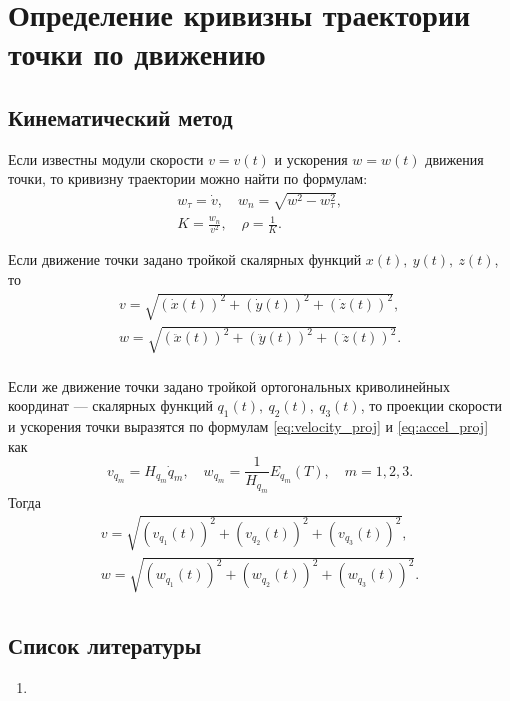 \section{Определение кривизны траектории точки по движению}

\subsection{Кинематический метод}

Если известны модули скорости $v = v(t)$ и ускорения $w = w(t)$ движения точки,
то кривизну траектории можно найти по формулам:
\begin{equation}
  \begin{gathered}
    w_\tau = \dot{v}, \quad w_n = \sqrt{w^2 - w_\tau^2}, \\
    K = \frac{w_n}{v^2}, \quad \rho = \frac{1}{K}.
  \end{gathered}
\end{equation}

Если движение точки задано тройкой скалярных функций $x(t),~y(t),~z(t)$, то
\begin{equation}
  \begin{gathered}
    v = \sqrt{(\dot{x}(t))^2 + (\dot{y}(t))^2 + (\dot{z}(t))^2}, \\
    w = \sqrt{(\ddot{x}(t))^2 + (\ddot{y}(t))^2 + (\ddot{z}(t))^2}. \\
  \end{gathered}
\end{equation}

Если же движение точки задано тройкой ортогональных криволинейных координат
--- скалярных функций $q_1(t),~q_2(t),~q_3(t)$, то проекции скорости и
ускорения точки выразятся по формулам \ref{eq:velocity_proj} и
\ref{eq:accel_proj} как
\begin{equation*}
  v_{q_m} = H_{q_m} \dot{q}_m, \quad w_{q_m} = \frac{1}{H_{q_m}} E_{q_m} (T),
    \quad m = 1,2,3.
\end{equation*}
Тогда
\begin{equation}
  \begin{gathered}
    v = \sqrt{(v_{q_1}(t))^2 + (v_{q_2}(t))^2 + (v_{q_3}(t))^2}, \\
    w = \sqrt{(w_{q_1}(t))^2 + (w_{q_2}(t))^2 + (w_{q_3}(t))^2}. \\
  \end{gathered}
\end{equation}

\subsection{Список литературы}
\begin{enumerate}
  \item \cite{lectures}
\end{enumerate}


